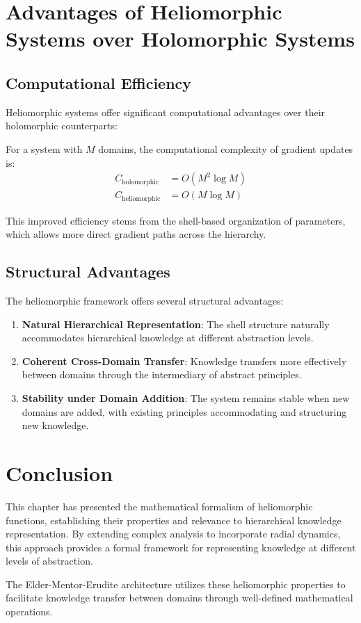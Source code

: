 \section{Advantages of Heliomorphic Systems over Holomorphic Systems}

\subsection{Computational Efficiency}

Heliomorphic systems offer significant computational advantages over their holomorphic counterparts:

\begin{proposition}
For a system with $M$ domains, the computational complexity of gradient updates is:
\begin{align}
C_{\text{holomorphic}} &= O(M^2 \log M) \\
C_{\text{heliomorphic}} &= O(M \log M)
\end{align}
\end{proposition}

This improved efficiency stems from the shell-based organization of parameters, which allows more direct gradient paths across the hierarchy.

\subsection{Structural Advantages}

The heliomorphic framework offers several structural advantages:

\begin{enumerate}
    \item \textbf{Natural Hierarchical Representation}: The shell structure naturally accommodates hierarchical knowledge at different abstraction levels.
    
    \item \textbf{Coherent Cross-Domain Transfer}: Knowledge transfers more effectively between domains through the intermediary of abstract principles.
    
    \item \textbf{Stability under Domain Addition}: The system remains stable when new domains are added, with existing principles accommodating and structuring new knowledge.
\end{enumerate}

\section{Conclusion}

This chapter has presented the mathematical formalism of heliomorphic functions, establishing their properties and relevance to hierarchical knowledge representation. By extending complex analysis to incorporate radial dynamics, this approach provides a formal framework for representing knowledge at different levels of abstraction.

The Elder-Mentor-Erudite architecture utilizes these heliomorphic properties to facilitate knowledge transfer between domains through well-defined mathematical operations.